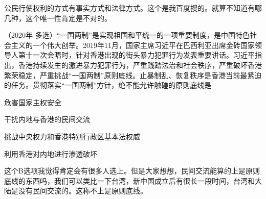 \documentclass[lang=cn,newtx,10pt,scheme=chinese,pad,twocol]{zznote}
\begin{document}
\begin{solution}
	公民行使权利的方式有事实方式和法律方式。这个是我百度搜的。就算不知道有哪几种，这个唯一性肯定是不对的。
\end{solution}
\begin{example} （2020年 多选）“一国两制”是实现祖国和平统一的一项重要制度，是中国特色社会主义的一个伟大创举。2019年11月，国家主席习近平在巴西利亚出席金砖国家领导人第十一次会晤时，针对香港出现的街头暴力犯罪行为发表重要讲话。习近平指出，香港持续发生的激进暴力犯罪行为，严重践踏法治和社会秩序，严重破坏香港繁荣稳定，严重挑战“一国两制”原则底线。止暴制乱、恢复秩序是香港当前最紧迫的任务。贯彻落实“一国两制”方针，绝不能允许触碰的原则底线是
	\begin{choice}
		\item 危害国家主权安全
		\item 干扰内地与香港的民间交流
		\item 挑战中央权力和香港特别行政区基本法权威
		\item 利用香港对内地进行渗透破坏
	\end{choice}
\end{example}
\begin{solution}
	这个B选项我觉得肯定会有很多人选上。但是大家想想，民间交流能算的上是原则底线的东西吗，我们可以类比一下台湾，新中国成立后有很长一段时间，台湾和大陆是没有民间交流的。这称不上是原则底线。
\end{solution}
\end{document}
